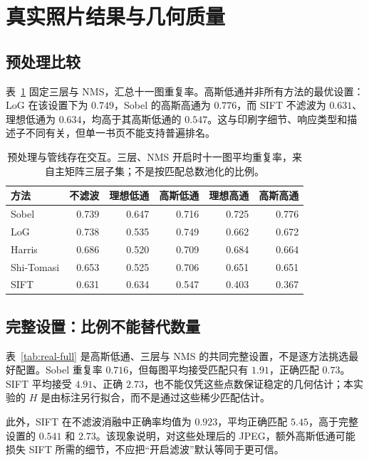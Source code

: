 \section{真实照片结果与几何质量}
\subsection{预处理比较}
表~\ref{tab:real-filters} 固定三层与 NMS，汇总十一图重复率。高斯低通并非所有方法的最优设置：LoG 在该设置下为 $0.749$，Sobel 的高斯高通为 $0.776$，而 SIFT 不滤波为 $0.631$、理想低通为 $0.634$，均高于其高斯低通的 $0.547$。这与印刷字细节、响应类型和描述子不同有关，但单一书页不能支持普遍排名。

\begin{table}[H]
\centering\small
\caption{预处理与管线存在交互。三层、NMS 开启时十一图平均重复率，来自主矩阵三层子集；不是按匹配总数池化的比例。}
\label{tab:real-filters}
\begin{tabular}{lrrrrr}
\toprule
方法 & 不滤波 & 理想低通 & 高斯低通 & 理想高通 & 高斯高通\\
\midrule
Sobel & 0.739 & 0.647 & 0.716 & 0.725 & 0.776\\
LoG & 0.738 & 0.535 & 0.749 & 0.662 & 0.672\\
Harris & 0.686 & 0.520 & 0.709 & 0.684 & 0.664\\
Shi-Tomasi & 0.653 & 0.525 & 0.706 & 0.651 & 0.651\\
SIFT & 0.631 & 0.634 & 0.547 & 0.403 & 0.367\\
\bottomrule
\end{tabular}
\end{table}

\subsection{完整设置：比例不能替代数量}
表~\ref{tab:real-full} 是高斯低通、三层与 NMS 的共同完整设置，不是逐方法挑选最好配置。Sobel 重复率 $0.716$，但每图平均接受匹配只有 $1.91$，正确匹配 $0.73$。SIFT 平均接受 $4.91$、正确 $2.73$，也不能仅凭这些点数保证稳定的几何估计；本实验的 $H$ 是由标注另行拟合，而不是通过这些稀少匹配估计。

此外，SIFT 在不滤波消融中正确率均值为 $0.923$，平均正确匹配 $5.45$，高于完整设置的 $0.541$ 和 $2.73$。该现象说明，对这些处理后的 JPEG，额外高斯低通可能损失 SIFT 所需的细节，不应把“开启滤波”默认等同于更可信。

